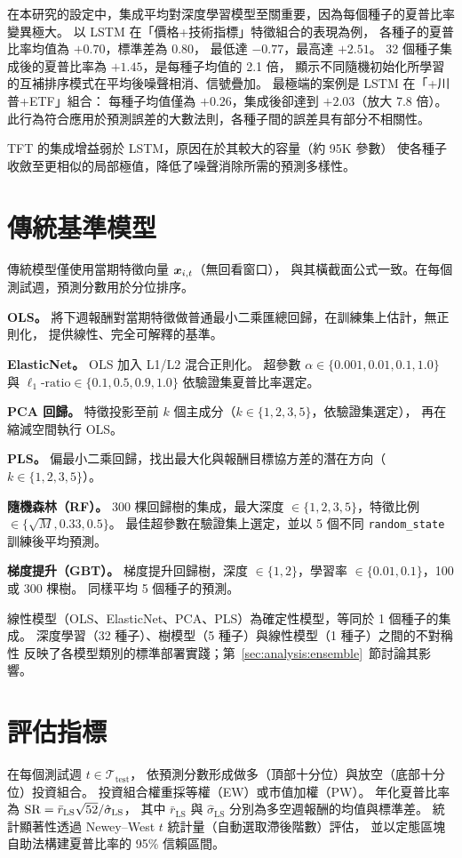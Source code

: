 在本研究的設定中，集成平均對深度學習模型至關重要，因為每個種子的夏普比率變異極大。
以 LSTM 在「價格+技術指標」特徵組合的表現為例，
各種子的夏普比率均值為 $+0.70$，標準差為 $0.80$，
最低達 $-0.77$，最高達 $+2.51$。
32 個種子集成後的夏普比率為 $+1.45$，是每種子均值的 2.1 倍，
顯示不同隨機初始化所學習的互補排序模式在平均後噪聲相消、信號疊加。
最極端的案例是 LSTM 在「+川普+ETF」組合：
每種子均值僅為 $+0.26$，集成後卻達到 $+2.03$（放大 7.8 倍）。
此行為符合應用於預測誤差的大數法則，各種子間的誤差具有部分不相關性。

TFT 的集成增益弱於 LSTM，原因在於其較大的容量（約 95K 參數）
使各種子收斂至更相似的局部極值，降低了噪聲消除所需的預測多樣性。

\section{傳統基準模型}
\label{sec:method:baselines}

傳統模型僅使用當期特徵向量 $\bm{x}_{i,t}$（無回看窗口），
與其橫截面公式一致。在每個測試週，預測分數用於分位排序。

\textbf{OLS。}
將下週報酬對當期特徵做普通最小二乘匯總回歸，在訓練集上估計，無正則化，
提供線性、完全可解釋的基準。

\textbf{ElasticNet。}
OLS 加入 L1/L2 混合正則化。
超參數 $\alpha \in \{0.001, 0.01, 0.1, 1.0\}$ 與
$\ell_1\text{-ratio} \in \{0.1, 0.5, 0.9, 1.0\}$ 依驗證集夏普比率選定。

\textbf{PCA 回歸。}
特徵投影至前 $k$ 個主成分（$k \in \{1,2,3,5\}$，依驗證集選定），
再在縮減空間執行 OLS。

\textbf{PLS。}
偏最小二乘回歸，找出最大化與報酬目標協方差的潛在方向（$k \in \{1,2,3,5\}$）。

\textbf{隨機森林（RF）。}
300 棵回歸樹的集成，最大深度 $\in \{1,2,3,5\}$，特徵比例 $\in \{\sqrt{M}, 0.33, 0.5\}$。
最佳超參數在驗證集上選定，並以 5 個不同 \texttt{random\_state} 訓練後平均預測。

\textbf{梯度提升（GBT）。}
梯度提升回歸樹，深度 $\in \{1,2\}$，學習率 $\in \{0.01, 0.1\}$，100 或 300 棵樹。
同樣平均 5 個種子的預測。

線性模型（OLS、ElasticNet、PCA、PLS）為確定性模型，等同於 1 個種子的集成。
深度學習（32 種子）、樹模型（5 種子）與線性模型（1 種子）之間的不對稱性
反映了各模型類別的標準部署實踐；第~\ref{sec:analysis:ensemble}~節討論其影響。

\section{評估指標}
\label{sec:method:eval}

在每個測試週 $t \in \mathcal{T}_{\text{test}}$，
依預測分數形成做多（頂部十分位）與放空（底部十分位）投資組合。
投資組合權重採等權（EW）或市值加權（PW）。
年化夏普比率為
$\mathrm{SR} = \bar{r}_\text{LS} \sqrt{52} / \hat{\sigma}_\text{LS}$，
其中 $\bar{r}_\text{LS}$ 與 $\hat{\sigma}_\text{LS}$ 分別為多空週報酬的均值與標準差。
統計顯著性透過 Newey--West $t$ 統計量（自動選取滯後階數）評估，
並以定態區塊自助法構建夏普比率的 95\% 信賴區間。

